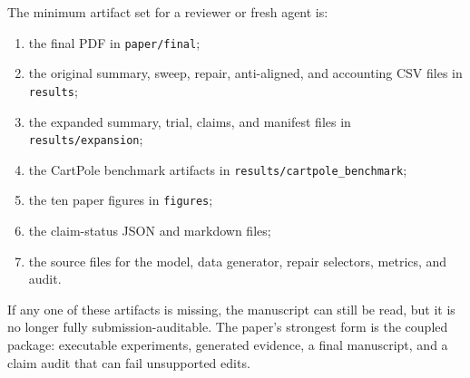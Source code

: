 The minimum artifact set for a reviewer or fresh agent is:
\begin{enumerate}
  \item the final PDF in \texttt{paper/final};
  \item the original summary, sweep, repair, anti-aligned, and accounting CSV files in \texttt{results};
  \item the expanded summary, trial, claims, and manifest files in \texttt{results/expansion};
  \item the CartPole benchmark artifacts in \texttt{results/cartpole\_benchmark};
  \item the ten paper figures in \texttt{figures};
  \item the claim-status JSON and markdown files;
  \item the source files for the model, data generator, repair selectors, metrics, and audit.
\end{enumerate}
If any one of these artifacts is missing, the manuscript can still be read, but it is no longer fully submission-auditable. The paper's strongest form is the coupled package: executable experiments, generated evidence, a final manuscript, and a claim audit that can fail unsupported edits.
